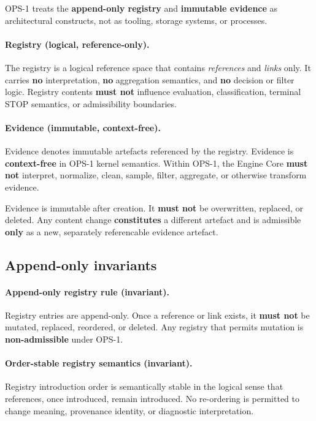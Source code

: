 OPS-1 treats the \textbf{append-only registry} and
\textbf{immutable evidence} as architectural constructs,
not as tooling, storage systems, or processes.

\paragraph{Registry (logical, reference-only).}
The registry is a logical reference space that contains
\emph{references} and \emph{links} only.
It carries \textbf{no} interpretation,
\textbf{no} aggregation semantics,
and \textbf{no} decision or filter logic.
Registry contents \textbf{must not} influence evaluation,
classification, terminal STOP semantics,
or admissibility boundaries.

\paragraph{Evidence (immutable, context-free).}
Evidence denotes immutable artefacts referenced by the registry.
Evidence is \textbf{context-free} in OPS-1 kernel semantics.
Within OPS-1, the Engine Core \textbf{must not} interpret,
normalize, clean, sample, filter, aggregate,
or otherwise transform evidence.

Evidence is immutable after creation.
It \textbf{must not} be overwritten, replaced, or deleted.
Any content change \textbf{constitutes} a different artefact
and is admissible \textbf{only} as a new,
separately referencable evidence artefact.

\subsection{Append-only invariants}

\paragraph{Append-only registry rule (invariant).}
Registry entries are append-only.
Once a reference or link exists,
it \textbf{must not} be mutated, replaced,
reordered, or deleted.
Any registry that permits mutation is
\textbf{non-admissible} under OPS-1.

\paragraph{Order-stable registry semantics (invariant).}
Registry introduction order is semantically stable
in the logical sense that references,
once introduced, remain introduced.
No re-ordering is permitted to change meaning,
provenance identity,
or diagnostic interpretation.

